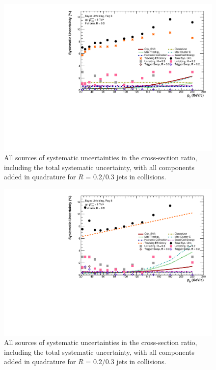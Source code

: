 \begin{figure}[hbt!]
    \centering
    \includegraphics[width=15cm]{figures/Systematics/ratios/TotalSystematics_R02R03.pdf}
    \caption{All sources of systematic uncertainties in the cross-section ratio, including the total systematic uncertainty, with all components added in quadrature for $R$ = 0.2/0.3 jets in \pp collisions.}
    \label{fig:SystematicsRatiosR02}
\end{figure}

\begin{figure}[hbt!]
    \centering
    \includegraphics[width=15cm]{figures/pPbFigures/Systematics/ratios/TotalSystematics_R02R03.pdf}
    \caption{All sources of systematic uncertainties in the cross-section ratio, including the total systematic uncertainty, with all components added in quadrature for $R$ = 0.2/0.3 jets in \pPb collisions.}
    \label{fig:SystematicsRatiosR02pPb}
\end{figure}

